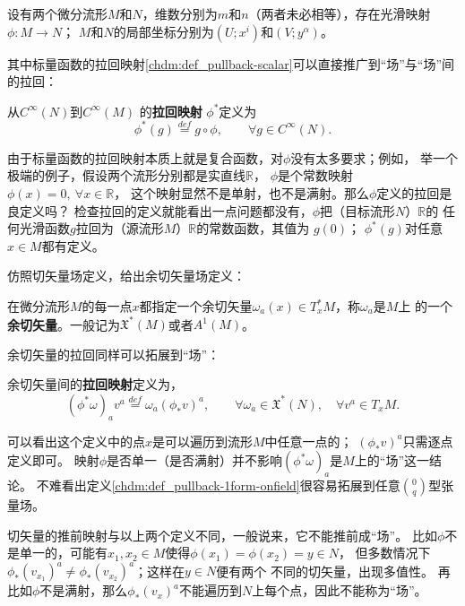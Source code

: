 设有两个微分流形$M$和$N$，维数分别为$m$和$n$（两者未必相等），存在光滑映射$\phi:M\to N$；
$M$和$N$的局部坐标分别为$(U;x^i)$和$(V;y^\alpha)$。



其中标量函数的拉回映射\ref{chdm:def_pullback-scalar}可以直接推广到“场”与“场”间的拉回：
\begin{definition}\label{chdm:def_pullback-scalar-onfield}
    从$C^\infty(N)$到$C^\infty(M)$
    的\textbf{拉回映射} $\phi^{*}$定义为
    \begin{equation}
        \phi^{*}(g) \overset{def}{=} g \circ \phi, 
        \qquad \forall g\in C^\infty(N) .
    \end{equation}
\end{definition}
由于标量函数的拉回映射本质上就是复合函数，对$\phi$没有太多要求；例如，
举一个极端的例子，假设两个流形分别都是实直线$\mathbb{R}$，
$\phi$是个常数映射 $\phi(x)=0,\ \forall x \in \mathbb{R}$，
这个映射显然不是单射，也不是满射。那么$\phi$定义的拉回是良定义吗？
检查拉回的定义就能看出一点问题都没有，$\phi$把（目标流形$N$）$\mathbb{R}$的
任何光滑函数$g$拉回为（源流形$M$）$\mathbb{R}$的常数函数，其值为 $g(0)$；
$\phi^*(g)$对任意$x\in M$都有定义。

仿照切矢量场定义，给出余切矢量场定义：
\begin{definition}\label{chdm:def_cotangent-vector-field}
    在微分流形$M$的每一点$x$都指定一个余切矢量$\omega_a(x)\in T^{*}_xM$，称$\omega_a$是$M$上
    的一个\textbf{余切矢量}。一般记为$\mathfrak{X}^{*}(M)$或者$A^1(M)$。
\end{definition}

余切矢量的拉回同样可以拓展到“场”：
\begin{definition}\label{chdm:def_pullback-1form-onfield}
    余切矢量间的\textbf{拉回映射}定义为，
    \begin{equation}
        (\phi^{*}\omega)_a v^a \overset{def}{=} \omega_a (\phi_{*}v)^a ,
        \qquad \forall \omega_a \in \mathfrak{X}^{*}(N),\quad \forall v^a \in T_{x}M .
    \end{equation}
\end{definition}
可以看出这个定义中的点$x$是可以遍历到流形$M$中任意一点的；
$(\phi_{*}v)^a$只需逐点定义即可。
映射$\phi$是否单一（是否满射）并不影响$(\phi^{*}\omega)_a$是$M$上的“场”这一结论。
不难看出定义\ref{chdm:def_pullback-1form-onfield}很容易拓展到任意$\binom{0}{q}$型张量场。

切矢量的推前映射与以上两个定义不同，一般说来，它不能推前成“场”。
比如$\phi$不是单一的，可能有$x_1,x_2\in M$使得$\phi(x_1)=\phi(x_2)=y\in N$，
但多数情况下$\phi_*(v_{x_1})^a \neq \phi_*(v_{x_2})^a$；这样在$y\in N$便有两个
不同的切矢量，出现多值性。
再比如$\phi$不是满射，那么$\phi_*(v_{x})^a$不能遍历到$N$上每个点，因此不能称为“场”。 


